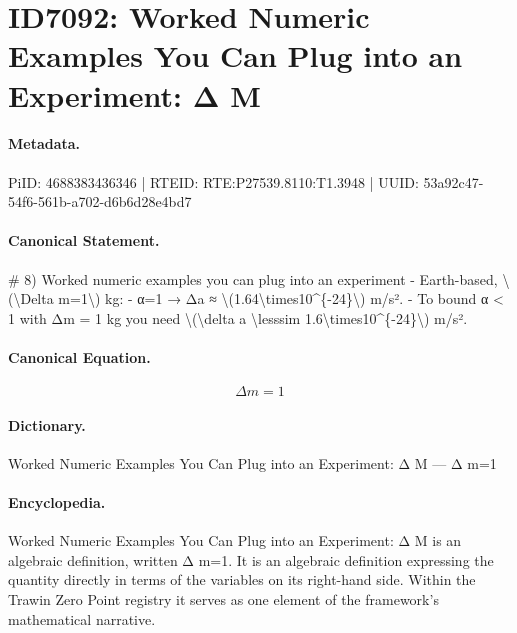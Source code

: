 \section*{ID7092: Worked Numeric Examples You Can Plug into an Experiment: Δ M}
\paragraph{Metadata.}
PiID: 4688383436346 | RTEID: RTE:P27539.8110:T1.3948 | UUID: 53a92c47-54f6-561b-a702-d6b6d28e4bd7

\paragraph{Canonical Statement.}
\# 8) Worked numeric examples you can plug into an experiment - Earth-based, \textbackslash{}(\textbackslash{}Delta m=1\textbackslash{}) kg: - α=1 → Δa ≈ \textbackslash{}(1.64\textbackslash{}times10\textasciicircum{}\{-24\}\textbackslash{}) m/s². - To bound α < 1 with Δm = 1 kg you need \textbackslash{}(\textbackslash{}delta a \textbackslash{}lesssim 1.6\textbackslash{}times10\textasciicircum{}\{-24\}\textbackslash{}) m/s².

\paragraph{Canonical Equation.}
\[
\Delta m=1
\]

\paragraph{Dictionary.}
Worked Numeric Examples You Can Plug into an Experiment: Δ M — Δ m=1

\paragraph{Encyclopedia.}
Worked Numeric Examples You Can Plug into an Experiment: Δ M is an algebraic definition, written Δ m=1. It is an algebraic definition expressing the quantity directly in terms of the variables on its right-hand side. Within the Trawin Zero Point registry it serves as one element of the framework's mathematical narrative.
